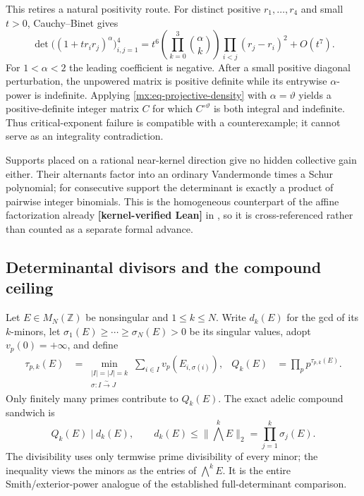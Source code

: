 \documentclass[11pt,oneside]{article}
\theoremstyle{definition}
\theoremstyle{remark}
\newcommand{\Z}{\mathbb Z}
\newcommand{\thetaq}{\vartheta}
\newcommand{\lean}[1]{\texttt{\detokenize{#1}}}
\newcommand{\statuslean}{\textcolor{leanblue}{\textbf{[kernel-verified Lean]}}}
\begin{document}
This retires a natural positivity route.  For distinct positive $r_1,\ldots,r_4$ and small
$t>0$, Cauchy--Binet gives
\begin{equation}
 \det\bigl((1+tr_ir_j)^\alpha\bigr)_{i,j=1}^4
 =t^6\left(\prod_{k=0}^3\binom\alpha k\right)
   \prod_{i<j}(r_j-r_i)^2+O(t^7).
 \label{mx:eq-hadamard-sign}
\end{equation}
For $1<\alpha<2$ the leading coefficient is negative.  After a small positive diagonal
perturbation, the unpowered matrix is positive definite while its entrywise $\alpha$-power
is indefinite.  Applying \eqref{mx:eq-projective-density} with $\alpha=\thetaq$ yields a
positive-definite integer matrix $C$ for which $C^{\circ\thetaq}$ is both integral and
indefinite.  Thus critical-exponent failure is compatible with a counterexample; it cannot
serve as an integrality contradiction.

Supports placed on a rational near-kernel direction give no hidden collective gain either.
Their alternants factor into an ordinary Vandermonde times a Schur polynomial; for consecutive
support the determinant is exactly a product of pairwise integer binomials.  This is the
homogeneous counterpart of the affine factorization already \statuslean{} in
\lean{CandidateAlternant}, so it is cross-referenced rather than counted as a separate formal
advance.

\subsection{Determinantal divisors and the compound ceiling}
\label{mx:compounds}

Let $E\in M_N(\Z)$ be nonsingular and $1\le k\le N$.  Write $d_k(E)$ for the gcd of its
$k$-minors, let $\sigma_1(E)\ge\cdots\ge\sigma_N(E)>0$ be its singular values, adopt
$v_p(0)=+\infty$, and define
\begin{align}
 \tau_{p,k}(E)&=
 \min_{\substack{|I|=|J|=k\\\sigma:I\overset\sim\longrightarrow J}}
 \sum_{i\in I}v_p(E_{i,\sigma(i)}),
 &Q_k(E)&=\prod_p p^{\tau_{p,k}(E)}.
 \label{mx:eq-compound-content}
\end{align}
Only finitely many primes contribute to $Q_k(E)$.
The exact adelic compound sandwich is
\begin{equation}
 Q_k(E)\mid d_k(E),
 \qquad
 d_k(E)\le\|\textstyle\bigwedge^kE\|_2
 =\prod_{j=1}^k\sigma_j(E).
 \label{mx:eq-compound-sandwich}
\end{equation}
The divisibility uses only termwise prime divisibility of every minor; the inequality views
the minors as the entries of $\bigwedge^kE$.  It is the entire Smith/exterior-power analogue
of the established full-determinant comparison.
\end{document}

